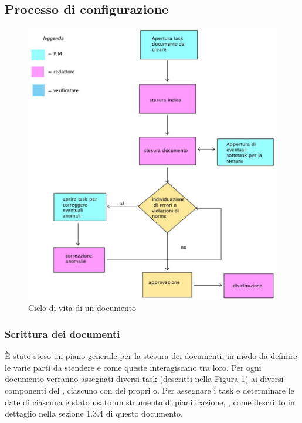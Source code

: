 \subsection{Processo di configurazione}

\label{figura 1.0}
\begin{figure}[ht]
	\centering
	\includegraphics[scale=0.8]{ciclo_di_vita.jpg}
	\caption{Ciclo di vita di un documento}
\end{figure}

\subsubsection{Scrittura dei documenti}
È stato steso un piano generale per la stesura dei documenti, in modo da definire le varie parti da stendere e come queste interagiscano tra loro.
Per ogni documento verranno assegnati diversi task (descritti nella Figura 1) ai diversi componenti del , ciascuno con dei propri o. Per assegnare i task e determinare le date di ciascuna  è stato usato un strumento di pianificazione, , come descritto in dettaglio nella sezione 1.3.4 di questo documento.

